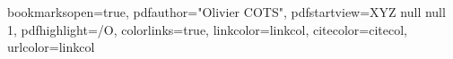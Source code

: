         \renewcommand{\colorSubSubSection}{ForestGreen}
        
    \fi
    
    \makeatletter
    \def\cleardoublepage{
        \clearpage
        \if@twoside 
            \ifodd
                \c@page
            \else%
                \hbox{}%
                \thispagestyle{empty}%
                \newpage%
                \if@twocolumn\hbox{}\newpage
                \fi
            \fi
        \fi}
    \makeatother
    
    \setcounter{minitocdepth}{2}
    \setlength{\mtcindent}{18pt} 
    \renewcommand{\mtcfont}{\small\rm} 
    \renewcommand{\mtcSfont}{\small\bf}
    
    \setcounter{secnumdepth}{4}
    \setcounter{tocdepth}{2} %
    
    \newenvironment{vcenterpage}
    {\newpage\vspace*{\fill}\thispagestyle{empty}\renewcommand{\headrulewidth}{0pt}}
    {\vspace*{\fill}}
    
    \renewcommand*{\backref}[1]{}
    \renewcommand*{\backrefalt}[4]{%
    \ifcase #1 %
    \or
    $\hookleftarrow$~#2.%
    \else
    $\hookleftarrow$~#2.%
    \fi}
    \renewcommand*{\backrefsep}{, }
    \renewcommand*{\backreftwosep}{ et~}
    \renewcommand*{\backreflastsep}{ et~}
    
    \newcommand{\myitem}{{\raisebox{0pt}{\textbullet}}}
    \setitemize[1]{label={\small \protect\myitem}}
                                   
\fi

\hypersetup
{
bookmarksopen=true,
pdfauthor="Olivier COTS",           %
pdfstartview={XYZ null null 1},
pdfhighlight=/O,                    %
colorlinks=true,                    %
linkcolor=linkcol,                  %
citecolor=citecol,                  %
urlcolor=linkcol                    %
}

